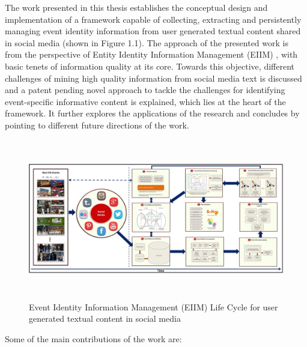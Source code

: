 The work presented in this thesis establishes the conceptual design and implementation of a framework capable of collecting, extracting and persistently managing event identity information from user generated textual content shared in social media (shown in Figure 1.1). The approach of the presented work is from the perspective of Entity Identity Information Management (EIIM) \cite{zhou2011entity}, with basic tenets of information quality at its core. Towards this objective, different challenges of mining high quality information from social media text is discussed and a patent pending novel approach to tackle the challenges for identifying event-specific informative content is explained, which lies at the heart of the framework. It further explores the applications of the research and concludes by pointing to different future directions of the work. 



\begin{figure}[htbp]
\label{eiim}
  \caption{Event Identity Information Management (EIIM) Life Cycle for user generated textual content in social media}
  \centering
    \includegraphics[width=15.5cm,height=7cm]{Figures/EIIM.jpg}
\end{figure}

Some of the main contributions of the work are:

